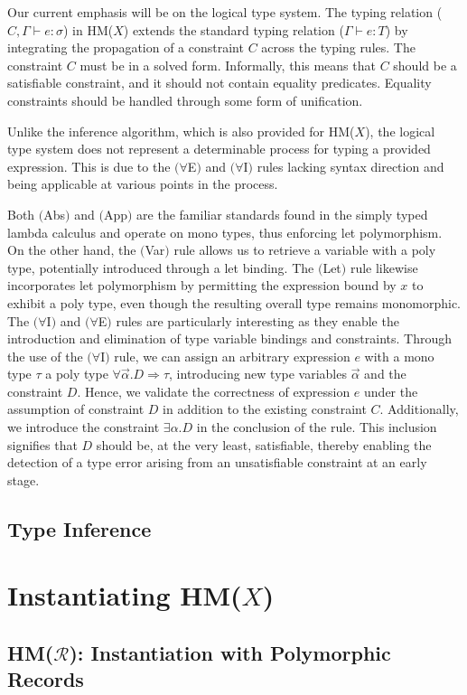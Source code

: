\documentclass[runningheads]{llncs}
\newcommand{\hmx}{HM($X$)}
\newcommand{\hmr}{HM($\mathcal{R}$)}
\begin{document}
Our current emphasis will be on the logical type system.
The typing relation ($C, Γ ⊢ e : σ$) in \hmx{} extends the standard typing
relation ($Γ ⊢ e : T$) by integrating the propagation of a constraint $C$
across the typing rules. The constraint $C$ must be in a solved form.
Informally, this means that $C$ should be a satisfiable constraint, and it
should not contain equality predicates. Equality constraints should be handled
through some form of unification.

Unlike the inference
algorithm, which is also provided for \hmx{}, the logical type system does not
represent a determinable process for typing a provided expression. This is due
to the $(∀$E$)$ and $(∀$I$)$ rules lacking syntax direction and being
applicable at various points in the process.

Both $($Abs$)$ and $($App$)$ are the familiar standards
found in the simply typed lambda
calculus and operate on mono types, thus enforcing let
polymorphism.
On the other hand, the $($Var$)$ rule allows us to
retrieve a variable with a poly type, potentially introduced through a let
binding.
The $($Let$)$ rule likewise incorporates let polymorphism by permitting the
expression bound by $x$ to exhibit a poly type, even though the resulting
overall type
remains monomorphic.
The $(∀$I$)$ and $(∀$E$)$ rules are particularly interesting as they enable the
introduction and elimination of type variable bindings and constraints.
Through the use of the $(∀$I$)$ rule, we can assign an arbitrary expression $e$
with a mono type $τ$ a poly type $∀ \Vec α.D ⇒ τ$, introducing new type
variables $\Vec α$ and the constraint $D$.
Hence, we validate the correctness of expression $e$ under the assumption of
constraint $D$ in addition to the existing constraint $C$.
Additionally, we introduce the constraint $∃α. D$ in the conclusion of the
rule. This inclusion signifies that $D$ should be, at the very least,
satisfiable, thereby enabling the detection of a type error arising from an
unsatisfiable constraint at an early stage.

\subsection{Type Inference}
\section{Instantiating \hmx{}}
\subsection{\hmr{}: Instantiation with Polymorphic Records}
\end{document}
